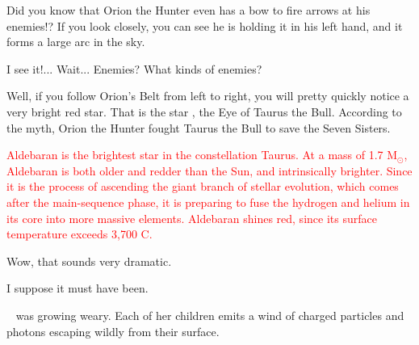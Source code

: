 \documentclass[main.tex]{subfiles}
\begin{document}
\par \Pleione Did you know that Orion the Hunter even has a bow to fire arrows at his enemies!?  If you look closely, you can see he is holding it in his left hand, and it forms a large arc in the sky.

\par \Maia I see it!... Wait... Enemies?  What kinds of enemies?

\par \Pleione Well, if you follow Orion's Belt from left to right, you will pretty quickly notice a very bright red star.  That is the star \rmaldebarran, the Eye of Taurus the Bull.  According to the myth, Orion the Hunter fought Taurus the Bull to save the Seven Sisters.  

\begin{tcolorbox}[sharp corners, colback=red!30, colframe=red!80!blue, title=Aldebaran]
\par \textcolor{red} {Aldebaran is the brightest star in the constellation Taurus.  At a mass of 1.7 M$_{\odot}$, Aldebaran is both older and redder than the Sun, and intrinsically brighter.  Since it is the process of ascending the giant branch of stellar evolution, which comes after the main-sequence phase, it is preparing to fuse the hydrogen and helium in its core into more massive elements.  Aldebaran shines red, since its surface temperature exceeds 3,700 C.}
\end{tcolorbox}

\par \Maia Wow, that sounds very dramatic.

\par \Pleione I suppose it must have been.

\par \nar \rmpleione~ was growing weary.  Each of her children emits a wind of charged particles and photons escaping wildly from their surface.
\end{document}
